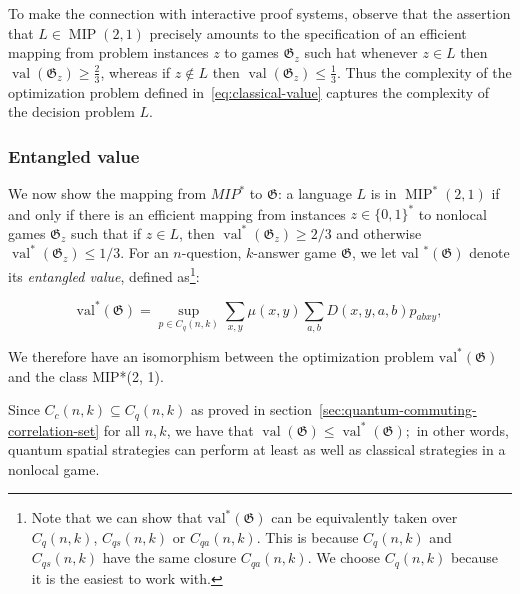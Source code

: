 To make the connection with interactive proof systems, observe that the assertion that $L \in \operatorname{MIP}(2,1)$ precisely amounts to the specification of an efficient mapping from problem instances $z$ to games $\mathfrak{G}_{z}$ such hat whenever $z \in L$ then $\operatorname{val}\left(\mathfrak{G}_{z}\right) \geq \frac{2}{3}$, whereas if $z \notin L$ then $\operatorname{val}\left(\mathfrak{G}_{z}\right) \leq \frac{1}{3}$. Thus the complexity of the optimization problem defined in~\ref{eq:classical-value} captures the complexity of the decision problem $L$.

\subsubsection{Entangled value}\label{subsection:quantum-games}

We now show the mapping from $MIP^{*}$ to $\mathfrak{G}$: a language $L$ is in $\operatorname{MIP}^{*}(2,1)$ if and only if there is an efficient mapping from instances $z \in\{0,1\}^{*}$ to nonlocal games $\mathfrak{G}_{z}$ such that if $z \in L$, then $\operatorname{val}^{*}\left(\mathfrak{G}_{z}\right) \geq 2 / 3$ and otherwise $\operatorname{val}^{*}\left(\mathfrak{G}_{z}\right) \leq 1 / 3$.
 For an $n$-question, $k$-answer game $\mathfrak{G}$, we let val ${ }^{*}(\mathfrak{G})$ denote its \emph{entangled value}, defined as\footnote{Note that we can show that $\operatorname{val^{*}}(\mathfrak{G})$ can be equivalently taken over $C_{q}(n, k)$, $C_{q s}(n, k)$ or $C_{q a}(n, k)$. This is because $C_{q}(n, k)$ and $C_{q s}(n, k)$ have the same closure $C_{q a}(n, k)$. We choose $C_{q}(n, k)$ because it is the easiest to work with.}:

\begin{defn}\label{defn:entangled-value}
    \begin{equation}
    \operatorname{val^{*}}(\mathfrak{G})=\sup _{p \in C_{q}(n, k)} \sum_{x, y} \mu(x, y) \sum_{a, b} D(x, y, a, b) p_{a b x y},
    \end{equation}
\end{defn}


We therefore have an isomorphism between the optimization problem $\operatorname{val^{*}}(\mathfrak{G})$ and the class MIP*(2, 1).


Since $C_{c}(n, k) \subseteq C_{q}(n, k)$ as proved in section~\ref{sec:quantum-commuting-correlation-set} for all $n, k$, we have that $\operatorname{val}(\mathfrak{G}) \leq \operatorname{val}^{*}(\mathfrak{G}) ;$ in other words, quantum spatial strategies can perform at least as well as classical strategies in a nonlocal game.

